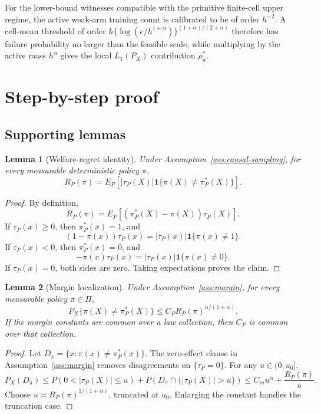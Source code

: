 \documentclass[11pt]{article}
\newcommand{\one}{\mathbf{1}}
\theoremstyle{definition}
\theoremstyle{plain}
\newtheorem{lemma}{Lemma}
\theoremstyle{remark}
\begin{document}
For the lower-bound witnesses compatible with the primitive finite-cell
upper regime, the active weak-arm training count is calibrated to be of
order \(h^{-2}\).  A cell-mean threshold of order
\(h\{\log(e/h^{1+\alpha})\}^{(1+\alpha)/(2+\alpha)}\) therefore has failure
probability no larger than the feasible scale, while multiplying by the
active mass \(h^\alpha\) gives the local \(L_1(P_X)\) contribution
\(\bar\rho_n^*\).

\section{Step-by-step proof}
\subsection*{Supporting lemmas}
\begin{lemma}[Welfare-regret identity]\label{lem:welfare-identity}
Under Assumption~\ref{ass:causal-sampling}, for every measurable
deterministic policy \(\pi\),
\[
R_P(\pi)=E_P[|\tau_P(X)|\one\{\pi(X)\ne\pi_P^*(X)\}].
\]
\end{lemma}
\begin{proof}
By definition,
\[
R_P(\pi)
=E_P[(\pi_P^*(X)-\pi(X))\tau_P(X)].
\]
If \(\tau_P(x)\ge0\), then \(\pi_P^*(x)=1\), and
\[
(1-\pi(x))\tau_P(x)
=|\tau_P(x)|\one\{\pi(x)\ne1\}.
\]
If \(\tau_P(x)<0\), then \(\pi_P^*(x)=0\), and
\[
-\pi(x)\tau_P(x)
=|\tau_P(x)|\one\{\pi(x)\ne0\}.
\]
If \(\tau_P(x)=0\), both sides are zero.  Taking expectations proves the
claim.
\end{proof}

\begin{lemma}[Margin localization]\label{lem:margin-localization}
Under Assumption~\ref{ass:margin}, for every measurable policy \(\pi\in\Pi\),
\[
P_X\{\pi(X)\ne\pi_P^*(X)\}
\le C_P R_P(\pi)^{\alpha/(1+\alpha)}.
\]
If the margin constants are common over a law collection, then \(C_P\) is
common over that collection.
\end{lemma}
\begin{proof}
Let \(D_\pi=\{x:\pi(x)\ne\pi_P^*(x)\}\).  The zero-effect clause in
Assumption~\ref{ass:margin} removes disagreements on \(\{\tau_P=0\}\).  For
any \(u\in(0,u_0]\),
\[
P_X(D_\pi)
\le
P(0<|\tau_P(X)|\le u)
+P(D_\pi\cap\{|\tau_P(X)|>u\})
\le C_m u^\alpha+\frac{R_P(\pi)}{u}.
\]
Choose \(u\asymp R_P(\pi)^{1/(1+\alpha)}\), truncated at \(u_0\).  Enlarging
the constant handles the truncation case.
\end{proof}
\end{document}
